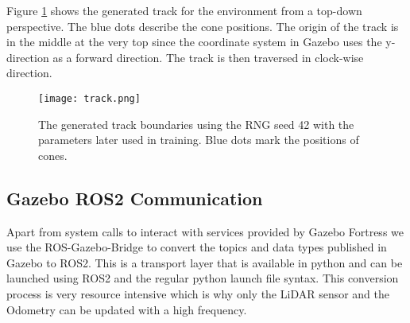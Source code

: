 Figure \ref{fig:track} shows the generated track for the environment from a top-down perspective. The blue dots describe the cone positions. The origin of the track is in the middle at the very top since the coordinate system in Gazebo uses the y-direction as a forward direction. The track is then traversed in clock-wise direction.

\begin{figure}[ht]
\vskip 0.2in
\begin{center}
\centerline{\texttt{[image: track.png]}}
\caption{The generated track boundaries using the RNG seed 42 with the parameters later used in training. Blue dots mark the positions of cones.}
\label{fig:track}
\end{center}
\vskip -0.2in
\end{figure}

\subsection{Gazebo ROS2 Communication}

Apart from system calls to interact with services provided by Gazebo Fortress we use the ROS-Gazebo-Bridge to convert the topics and data types published in Gazebo to ROS2. 
This is a transport layer that is available in python and can be launched using ROS2 and the regular python launch file syntax. 
This conversion process is very resource intensive which is why only the LiDAR sensor and the Odometry can be updated with a high frequency.

